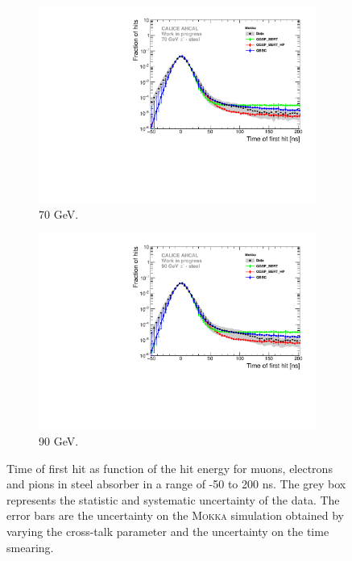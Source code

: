 \documentclass{JINST}
\newcommand\mokka{\textsc{Mokka}\xspace}
\begin{document}
\begin{figure}[htbp!]
\begin{subfigure}[t]{0.49\textwidth}
    \includegraphics[width=1\textwidth]{fig/Comparison_SimData_Pion70GeV_LateClusters.pdf}
    \caption{70 GeV.} \label{fig:dNdt_SimData_70GeV}
  \end{subfigure}
  \hfill
  \begin{subfigure}[t]{0.49\textwidth}
    \centering
    \includegraphics[width=1\textwidth]{fig/Comparison_SimData_Pion90GeV_LateClusters.pdf}
    \caption{90 GeV.} \label{fig:dNdt_SimData_90GeV}
  \end{subfigure}
  \caption{Time of first hit as function of the hit energy for muons, electrons and pions in steel absorber in a range of -50 to 200 ns. The grey box represents the statistic and systematic uncertainty of the data. The error bars are the uncertainty on the \mokka simulation obtained by varying the cross-talk parameter and the uncertainty on the time smearing.}
\end{figure}
\end{document}
